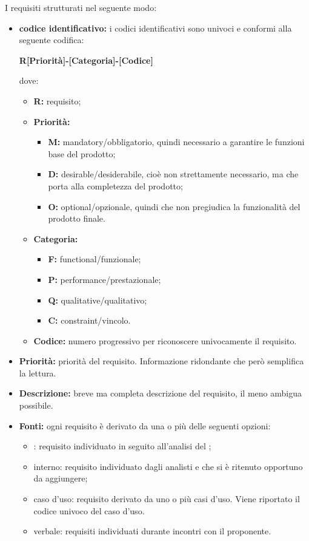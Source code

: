 
I requisiti strutturati nel seguente modo:

\begin{itemize}
	
	\item \textbf{codice identificativo:} i codici identificativi sono univoci e conformi alla seguente codifica:
	\begin{center}
		\textbf{R[Priorità]-[Categoria]-[Codice]}
	\end{center}
	dove: 
		\begin{itemize}
			\item \textbf{R:} requisito;
			\item \textbf{Priorità:}
			\begin{itemize}
				\item \textbf{M:} mandatory/obbligatorio, quindi necessario a garantire le funzioni base del prodotto;
				\item \textbf{D:} desirable/desiderabile, cioè non strettamente necessario, ma che porta alla completezza del prodotto;
				\item \textbf{O:} optional/opzionale, quindi che non pregiudica la funzionalità del prodotto finale.
			\end{itemize}
			\item \textbf{Categoria:}
			\begin{itemize}
				\item \textbf{F:} functional/funzionale;
				\item \textbf{P:} performance/prestazionale;
				\item \textbf{Q:} qualitative/qualitativo;
				\item \textbf{C:} constraint/vincolo.
			\end{itemize}
			\item \textbf{Codice:} numero progressivo per riconoscere univocamente il requisito.
		\end{itemize}
	
	\item \textbf{Priorità:} priorità del requisito. Informazione ridondante che però semplifica la lettura.
	
	\item \textbf{Descrizione:} breve ma completa descrizione del requisito, il meno ambigua possibile. 
	
	\item \textbf{Fonti:} ogni requisito è derivato da una o più delle seguenti opzioni:
		\begin{itemize}
			\item {}: requisito individuato in seguito all'analisi del ;
			\item interno: requisito individuato dagli analisti e che si è ritenuto opportuno da aggiungere;
			\item caso d'uso: requisito derivato da uno o più casi d'uso. Viene riportato il codice univoco del caso d'uso.
			\item verbale: requisiti individuati durante incontri con il proponente.			
		\end{itemize}	
\end{itemize}
 \newpage
